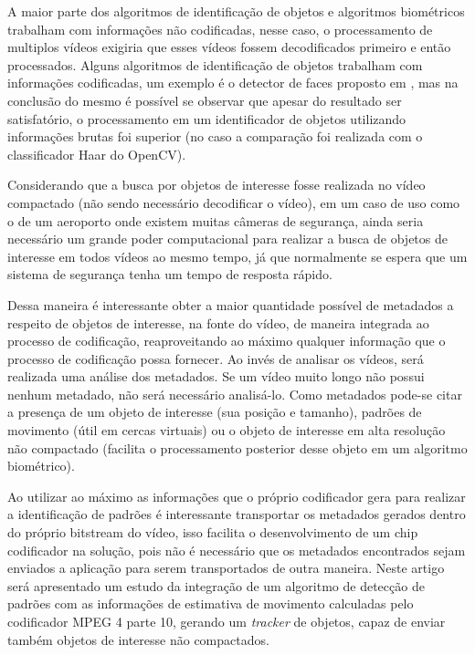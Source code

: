 \documentclass[12pt]{article}
\begin{document}
A maior parte dos algoritmos de identificação de objetos e algoritmos biométricos trabalham com informações não codificadas, nesse caso, o processamento de multiplos vídeos exigiria que esses vídeos fossem decodificados primeiro e então processados. Alguns algoritmos de identificação de objetos trabalham com informações codificadas, um exemplo é o detector de faces proposto em \cite{faceDetectionH264}, mas na conclusão do mesmo é possível se observar que apesar do resultado ser satisfatório, o processamento em um identificador de objetos utilizando informações brutas foi superior (no caso a comparação foi realizada com o classificador Haar do OpenCV).

Considerando que a busca por objetos de interesse fosse realizada no vídeo compactado (não sendo necessário decodificar o vídeo), em um caso de uso como o de um aeroporto onde existem muitas câmeras de segurança, ainda seria necessário um grande poder computacional para realizar a busca de objetos de interesse em todos vídeos ao mesmo tempo, já que normalmente se espera que um sistema de segurança tenha um tempo de resposta rápido. 

Dessa maneira é interessante obter a maior quantidade possível de metadados a respeito de objetos de interesse, na fonte do vídeo, de maneira integrada ao processo de codificação, reaproveitando ao máximo qualquer informação que o processo de codificação possa fornecer. Ao invés de analisar os vídeos, será realizada uma análise dos metadados. Se um vídeo muito longo não possui nenhum metadado, não será necessário analisá-lo. Como metadados pode-se citar a presença de um objeto de interesse (sua posição e tamanho), padrões de movimento (útil em cercas virtuais) ou o objeto de interesse em alta resolução não compactado (facilita o processamento posterior desse objeto em um algoritmo biométrico).

Ao utilizar ao máximo as informações que o próprio codificador gera para realizar a identificação de padrões é interessante transportar os metadados gerados dentro do próprio bitstream do vídeo, isso facilita o desenvolvimento de um chip codificador na solução, pois não é necessário que os metadados encontrados sejam enviados a aplicação para serem transportados de outra maneira. Neste artigo será apresentado um estudo da integração de um algoritmo de detecção de padrões com as informações de estimativa de movimento calculadas pelo codificador MPEG 4 parte 10, gerando um \textit{tracker} de objetos, capaz de enviar também objetos de interesse não compactados.
\end{document}
